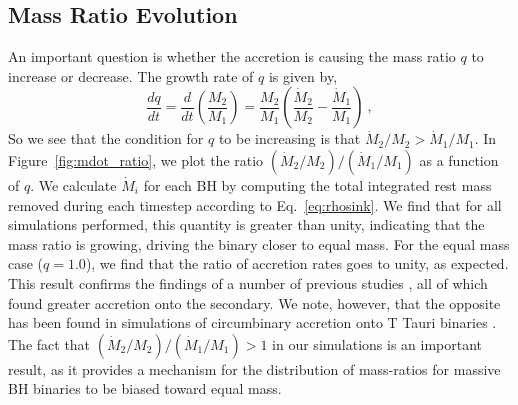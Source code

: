 \documentclass[apj]{emulateapj}
\begin{document}
\subsection{Mass Ratio Evolution}
An important question is whether the accretion is causing the mass ratio $q$ to increase or decrease. The growth rate of $q$ is given by,
\begin{equation}
  \frac{dq}{dt} = \frac{d}{dt}\left(\frac{M_2}{M_1}\right) = \frac{M_2}{M_1}\left(\frac{\dot{M}_2}{M_2}-\frac{\dot{M}_1}{M_1}\right) \ ,
\end{equation}
So we see that the condition for $q$ to be increasing is that $\dot{M}_2 / M_2 > \dot{M}_1 / M_1$. In Figure~\ref{fig:mdot_ratio}, we plot the ratio $(\dot{M}_2 / M_2) / (\dot{M}_1 / M_1)$ as a function of $q$. We calculate $\dot{M}_i$ for each BH by computing the total integrated rest mass removed during each timestep according to Eq.~\ref{eq:rhosink}. We find that for all simulations performed, this quantity is greater than unity, indicating that the mass ratio is growing, driving the binary closer to equal mass. For the equal mass case ($q=1.0$), we find that the ratio of accretion rates goes to unity, as expected. This result confirms the findings of a number of previous studies \citep{hayasaki07,cuadra09,roedig11,roedig12,hayasaki12}, all of which found greater accretion onto the secondary. We note, however, that the opposite has been found in simulations of circumbinary accretion onto T Tauri binaries \citep{valborro11}. The fact that $(\dot{M}_2 / M_2) / (\dot{M}_1 / M_1) > 1$ in our simulations is an important result, as it provides a mechanism for the distribution of mass-ratios for massive BH binaries to be biased toward equal mass.  
\end{document}
